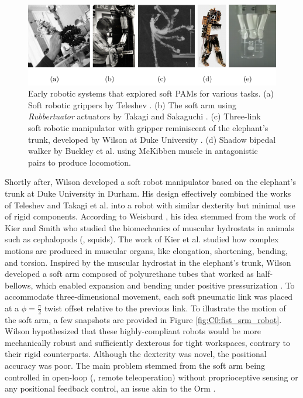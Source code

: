 \begin{figure}[!t]
  \includegraphics*[width=\textwidth]{./pdf/thesis-figure-2-5.pdf}
  \vspace{-5mm}
  \caption{Early robotic systems that explored soft PAMs for various tasks. (a) Soft robotic grippers by Teleshev \cite{Teleshev1981}. (b) The soft arm using \textit{Rubbertuator} actuators by Takagi and Sakaguchi \cite{Takagi1983}. (c) Three-link soft robotic manipulator with gripper reminiscent of the elephant's trunk, developed by Wilson at Duke University \cite{Wilson2007,Weisburd1988}. (d) Shadow bipedal walker by Buckley et al. \cite{Buckley2012} using McKibben muscle in antagonistic pairs to produce locomotion.
  \label{fig:C0:earlyPAMrobots}}
  \vspace{-2mm}
\end{figure}
%
\par Shortly after, Wilson \cite{Wilson2007} developed a soft robot manipulator based on the elephant's trunk at Duke University in Durham. His design effectively combined the works of Teleshev \cite{Teleshev1981} and Takagi et al. \cite{Takagi1983} into a robot with similar dexterity but minimal use of rigid components. According to Weisburd \cite{Weisburd1988}, his idea stemmed from the work of Kier and Smith \cite{Kier1985} who studied the biomechanics of muscular hydrostats in animals such as cephalopods (\eg, squids). The work of Kier et al. \cite{Kier1985} studied how complex motions are produced in muscular organs, like elongation, shortening, bending, and torsion. Inspired by the muscular hydrostat in the elephant's trunk, Wilson developed a soft arm composed of polyurethane tubes that worked as half-bellows, which enabled expansion and bending under positive pressurization \cite{Weisburd1988}. To accommodate three-dimensional movement, each soft pneumatic link was placed at a $\phi = \frac{\pi}{2}$ twist offset relative to the previous link. To illustrate the motion of the soft arm, a few snapshots are provided in Figure \ref{fig:C0:fist_srm_robot}. Wilson hypothesized that these highly-compliant robots would be more mechanically robust and sufficiently dexterous for tight workspaces, contrary to their rigid counterparts. Although the dexterity was novel, the positional accuracy was poor. The main problem stemmed from the soft arm being controlled in open-loop (\ie, remote teleoperation) without proprioceptive sensing or any positional feedback control, an issue akin to the Orm \cite{Corke2020}.

